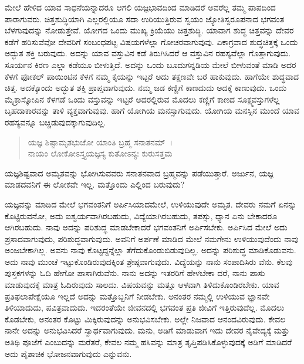 ಮೇಲೆ ಹೇಳಿದ ಯಾವ ಸಾಧನೆಯನ್ನಾದರೂ ಆಗಲಿ ಯಜ್ಞಭಾವದಿಂದ ಮಾಡಿದರೆ ಅವರೆಲ್ಲ ತಮ್ಮ ಪಾಪದಿಂದ ಪಾರಾಗುವರು. ಚಿತ್ತಶುದ್ಧಿಯಾಗಿ ಎಲ್ಲರಲ್ಲಿಯೂ ಸದಾ ಉರಿಯುತ್ತಿರುವ ಸ್ವಯಂ ಜ್ಯೋತಿಸ್ವರೂಪನಾದ ಭಗವಂತ ಬೆಳಗುವುದನ್ನು ನೋಡುತ್ತೇವೆ. ಯೋಗದ ಒಂದು ಮುಖ್ಯ ಕ್ರಿಯೆಯು ಚಿತ್ತಶುದ್ಧಿ. ಯಾವಾಗ ಶುದ್ಧ ಚಿತ್ತವನ್ನು ದೇವರ ಕಡೆಗೆ ಹರಿಸುವೆವೋ ದೇವರಿಗೆ ಸಂಬಂಧಪಟ್ಟ ವಿಷಯಗಳೆಲ್ಲಾ ಗೋಚರವಾಗುವುವು. ಏಕಾಗ್ರವಾದ ಶುದ್ಧಚಿತ್ತಕ್ಕೆ ಒಂದು ಅದ್ಭುತ ಶಕ್ತಿ ಬರುವುದು. ಅದನ್ನು ಯಾವ ವಸ್ತುವಿನ ಕಡೆ ತಿರುಗಿಸಿದರೆ ಆ ವಸ್ತುವಿನ ರಹಸ್ಯವೆಲ್ಲಾ ಗೊತ್ತಾಗುವುದು. ಸೂರ್ಯನ ಕಿರಣ ಎಲ್ಲಾ ಕಡೆಯೂ ಬೀಳುತ್ತಿದೆ. ಅದನ್ನು ಒಂದು ಬೂದುಗನ್ನಡಿಯ ಮೇಲೆ ಬೀಳುವಂತೆ ಮಾಡಿ ಅದರ ಕೆಳಗೆ ಫೋಕಲ್ ಪಾಯಿಂಟಿನ ಕೆಳಗೆ ನಮ್ಮ ಕೈಯನ್ನು ಇಟ್ಟರೆ ಅದು ತಕ್ಷಣವೇ ಬರೆ ಹಾಕುವುದು. ಹಾಗೆಯೇ ಶುದ್ಧವಾದ ಚಿತ್ತ. ಅದಕ್ಕೊಂದು ಅದ್ಭುತ ಶಕ್ತಿ ಪ್ರಾಪ್ತವಾಗುವುದು. ನಮ್ಮ ಜಡ ಕಣ್ಣಿಗೆ ಕಾಣದುದು ಅದಕ್ಕೆ ಕಾಣುವುದು. ಒಂದು ಮೈಕ್ರಾಸ್ಕೋಪಿನ ಕೆಳಗಡೆ ಒಂದು ವಸ್ತುವನ್ನು ಇಟ್ಟರೆ ಅದರಲ್ಲಿರುವ ಮೊದಲು ಕಣ್ಣಿಗೆ ಕಾಣದ ಸೂಕ್ಷ್ಮವಸ್ತುಗಳೆಲ್ಲ ಬೃಹದಾಕಾರವನ್ನು ತಾಳಿ ವ್ಯಕ್ತವಾಗುವುವು. ಹಾಗೆ ಯೋಗಿಯ ಮನಸ್ಸಾಗುವುದು. ಯೋಗಿಯ ಮನಸ್ಸಿನ ಮುಂದೆ ಯಾವ ರಹಸ್ಯವನ್ನೂ ಬಚ್ಚಿಡುವುದಕ್ಕಾಗುವುದಿಲ್ಲ.

\begin{verse}
ಯಜ್ಞ ಶಿಷ್ಟಾಮೃತಭುಜೋ ಯಾಂತಿ ಬ್ರಹ್ಮ ಸನಾತನಮ್~।\\ನಾಯಂ ಲೋಕೋಽಸ್ತ್ಯಯಜ್ಞಸ್ಯ ಕುತೋಽನ್ಯಃ ಕುರುಸತ್ತಮ 
\end{verse}

{\small ಯಜ್ಞಶಿಷ್ಟವಾದ ಅಮೃತವನ್ನು ಭೋಗಿಸುವವರು ಸನಾತನವಾದ ಬ್ರಹ್ಮವನ್ನು ಪಡೆಯುತ್ತಾರೆ. ಅರ್ಜುನ, ಯಜ್ಞ ಮಾಡದವನಿಗೆ ಈ ಲೋಕವೇ ಇಲ್ಲ. ಮತ್ತೊಂದು ಎಲ್ಲಿಂದ ಬರುವುದು?}

ಯಜ್ಞವನ್ನು ಮಾಡಿದ ಮೇಲೆ ಭಗವಂತನಿಗೆ ಅರ್ಪಿಸಿಯಾದಮೇಲೆ, ಉಳಿಯುವುದೇ ಅಮೃತ. ದೇವರು ನಮಗೆ ಏನನ್ನು ಕೊಟ್ಟಿರುವನೋ, ಅದು ಐಶ್ವರ್ಯವಾಗಿರಬಹುದು, ವಿದ್ಯೆಯಾಗಿರಬಹುದು, ತಪಸ್ಸು, ಧ್ಯಾನ ಏನು ಬೇಕಾದರೂ ಆಗಿರಬಹುದು. ನಾವು ಅದನ್ನು ಪರಿಶುದ್ಧ ಮಾಡಬೇಕಾದರೆ ಭಗವಂತನಿಗೆ ಅರ್ಪಿಸಬೇಕು. ಅರ್ಪಿಸಿದ ಮೇಲೆ ಅದು ಪ್ರಸಾದವಾಗುವುದು, ಪರಿಶುದ್ಧವಾಗುವುದು. ಅವನಿಗೆ ಅರ್ಪಣೆ ಮಾಡಿದ ಮೇಲೆ ನಮಗೇನು ಉಳಿಯುವುದೆಂದು ನಾವು ಅಂಜಬೇಕಾಗಿಲ್ಲ. ಅವನು ನಾವು ಕೊಟ್ಟದ್ದನ್ನೆಲ್ಲಾ ತೆಗೆದುಕೊಂಡುಬಿಡುವುದಿಲ್ಲ. ಅದನ್ನು ಪರಿಶುದ್ಧ ಮಾಡಿಕೊಡುವನು. ಅದು ನಾವು ಮುಂಚೆ ಇಟ್ಟುಕೊಂಡಿರುವುದಕ್ಕಿಂತ ಶ್ರೇಷ್ಠವಾಗುವುದು. ವಿದ್ಯೆಯನ್ನು ನಾನು ಸಂಪಾದಿಸಿರು ವೆನು. ಕೆಲವು ಪುಸ್ತಕಗಳನ್ನು ಓದಿ ಹೇಗೋ ಪಾಸಾಗಿರುವೆನು. ನಾನು ಅದನ್ನು ಇತರರಿಗೆ ಹೇಳಬೇಕಾ ದರೆ, ನಾನು ಪಾಸು ಮಾಡುವುದಕ್ಕೆ ಮಾತ್ರ ಓದಿರುವುದು ಸಾಲದು. ವಿಷಯವನ್ನು ಮತ್ತೂ ಆಳವಾಗಿ ತಿಳಿದುಕೊಂಡಿರಬೇಕು. ಯಾವ ಪ್ರತಿಫಲಾಪೇಕ್ಷೆಯೂ ಇಲ್ಲದೆ ಅದನ್ನು ಮತ್ತೊಬ್ಬನಿಗೆ ನೀಡಬೇಕು. ಅನಂತರ ನಮ್ಮಲ್ಲಿ ಉಳಿಯುವ ಜ್ಞಾನವೇ ತಿಳಿಯಾದುದು, ಪವಿತ್ರವಾದುದು. ಇದರಂತೆಯೇ ಜೀವನದಲ್ಲಿ ಭಗವಂತ ಪ್ರತಿ ಜೀವಿಗೆ ಇತ್ತಿರುವುದೆಲ್ಲ. ಮೊದಲು ಕೊಡಬೇಕು, ಅನಂತರ ಕೊಟ್ಟು ಮಿಕ್ಕಿರುವುದನ್ನು ಅನುಭವಿಸಬೇಕು. ಅಲ್ಲೇ ನಿಜವಾದ ಆನಂದವಿರುವುದು. ಕೇವಲ ನಾನೇ ಅದನ್ನು ಅನುಭವಿಸಿದರೆ ಸ್ವಾರ್ಥವಾಗುವುದು. ಮನು, ಅಡಿಗೆ ಮಾಡುವಾಗ ಇದು ದೇವರ ನೈವೇದ್ಯಕ್ಕೆ ಮತ್ತು ಅತಿಥಿ ಪೂಜೆಗೆ ಎಂಬುದನ್ನು ಮರೆತರೆ, ಕೇವಲ ನಮ್ಮ ಹಸಿವನ್ನು ಮಾತ್ರ ತೃಪ್ತಿಪಡಿಸಿಕೊಳ್ಳುವುದಕ್ಕೆ ಅಡಿಗೆ ಮಾಡಿದರೆ ಅದು ಪೈಶಾಚಿಕ ಭೋಜನವಾಗುವುದು ಎನ್ನುವನು.

